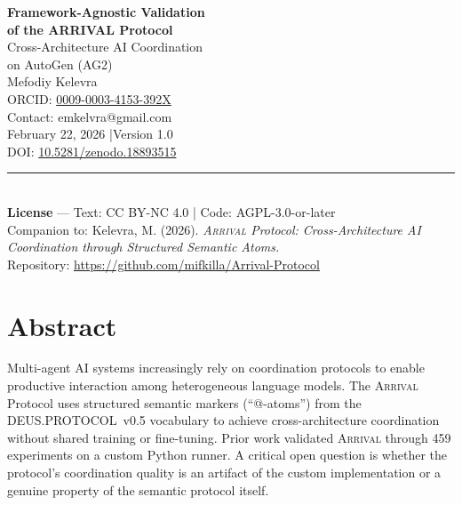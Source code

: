 \documentclass[11pt,a4paper]{article}
\newcommand{\arrival}{\textsc{Arrival}\xspace}
\begin{document}
\begin{titlepage}
\centering
\vspace*{2cm}

{\Huge\bfseries Framework-Agnostic Validation\\
of the ARRIVAL Protocol}\\[0.8cm]
{\Large Cross-Architecture AI Coordination\\
on AutoGen (AG2)}\\[2.5cm]

{\large Mefodiy Kelevra}\\[0.3cm]
{\small ORCID:
  \href{https://orcid.org/0009-0003-4153-392X}{0009-0003-4153-392X}}\\[0.3cm]
{\small Contact: emkelvra@gmail.com}\\[2cm]

{\normalsize February 22, 2026 \enspace|\enspace Version 1.0}\\[0.5cm]
{\small DOI: \href{https://doi.org/10.5281/zenodo.18893515}%
  {10.5281/zenodo.18893515}}\\[2cm]

\rule{0.6\textwidth}{0.4pt}\\[0.8cm]

{\footnotesize
  \textbf{License} — Text: CC BY-NC 4.0 \enspace|\enspace
  Code: AGPL-3.0-or-later\\[0.4cm]
  Companion to: Kelevra, M. (2026). \textit{\arrival Protocol:
  Cross-Architecture AI Coordination through Structured Semantic Atoms.}\\[0.2cm]
  Repository:
  \url{https://github.com/mifkilla/Arrival-Protocol}
}

\vfill
\end{titlepage}

\tableofcontents
\newpage

\section{Abstract}

Multi-agent AI systems increasingly rely on coordination protocols to
enable productive interaction among heterogeneous language models.  The
\arrival Protocol uses structured semantic markers (``@-atoms'') from the
DEUS.PROTOCOL~v0.5 vocabulary to achieve cross-architecture coordination
without shared training or fine-tuning.  Prior work validated \arrival
through 459 experiments on a custom Python runner.  A critical open
question is whether the protocol's coordination quality is an artifact
of the custom implementation or a genuine property of the semantic
protocol itself.
\end{document}
